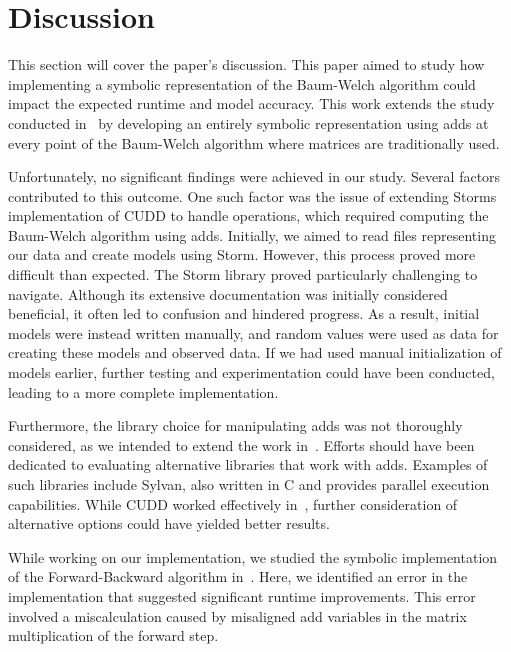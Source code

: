 

\section{Discussion}\label{sec:discussion}
This section will cover the paper's discussion. 
This paper aimed to study how implementing a symbolic representation of the Baum-Welch algorithm could impact the expected runtime and model accuracy. 
This work extends the study conducted in~\cite{p7} by developing an entirely symbolic representation using \glspl{add} at every point of the Baum-Welch algorithm where matrices are traditionally used.

Unfortunately, no significant findings were achieved in our study. Several factors contributed to this outcome. 
One such factor was the issue of extending Storms implementation of CUDD to handle operations, which required computing the Baum-Welch algorithm using \glspl{add}. 
Initially, we aimed to read files representing our data and create models using Storm. 
However, this process proved more difficult than expected. 
The Storm library proved particularly challenging to navigate. 
Although its extensive documentation was initially considered beneficial, it often led to confusion and hindered progress. 
As a result, initial models were instead written manually, and random values were used as data for creating these models and observed data. 
If we had used manual initialization of models earlier, further testing and experimentation could have been conducted, leading to a more complete implementation.

Furthermore, the library choice for manipulating \glspl{add} was not thoroughly considered, as we intended to extend the work in~\cite{p7}.
Efforts should have been dedicated to evaluating alternative libraries that work with \glspl{add}. 
Examples of such libraries include Sylvan, also written in C and provides parallel execution capabilities. 
While CUDD worked effectively in~\cite{p7}, further consideration of alternative options could have yielded better results.

While working on our implementation, we studied the symbolic implementation of the Forward-Backward algorithm in~\cite{p7}. 
Here, we identified an error in the implementation that suggested significant runtime improvements. 
This error involved a miscalculation caused by misaligned \gls{add} variables in the matrix multiplication of the forward step.


